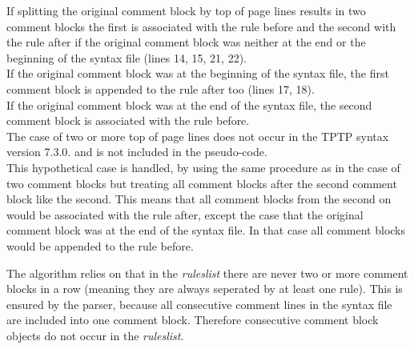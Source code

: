 If splitting the original comment block by top of page lines results in two comment blocks the first is associated with the rule before and the second with the rule after if the original comment block was neither at the end or the beginning of the syntax file (lines 14, 15, 21, 22).\\
If the original comment block was at the beginning of the syntax file, the first comment block is appended to the rule 
after too (lines 17, 18).\\
If the original comment block was at the end of the syntax file, the second comment block is associated with the rule before.\\
The case of two or more top of page lines does not occur in the \ac{TPTP} syntax version 7.3.0. and is not included in the pseudo-code.\\
This hypothetical case is handled, by using the same procedure as in the case of two comment blocks but treating all comment blocks after the second comment block like the second. This means that all comment blocks from the second on would be associated with the rule after, except the case that the original comment block was at the end of the syntax file. In that case all comment blocks would be appended to the rule before.

The algorithm relies on that in the \textit{rules\textunderscore list} there are never two or more comment blocks in a row (meaning they are always seperated by at least one rule). This is ensured by the parser, because all consecutive comment lines in the syntax file are included into one comment block. Therefore consecutive comment block objects do not occur in the \textit{rules\textunderscore list}.

